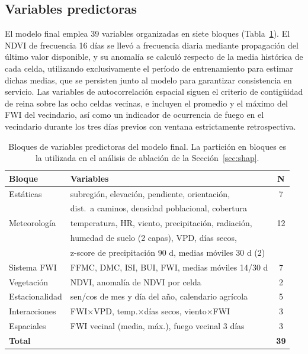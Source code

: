 \documentclass[11pt,a4paper]{article}
\begin{document}
\subsection{Variables predictoras}

El modelo final emplea 39 variables organizadas en siete bloques
(Tabla~\ref{tab:features}). El NDVI de frecuencia 16 días se llevó a
frecuencia diaria mediante propagación del último valor disponible, y su
anomalía se calculó respecto de la media histórica de cada celda,
utilizando exclusivamente el período de entrenamiento para estimar dichas
medias, que se persisten junto al modelo para garantizar consistencia en
servicio. Las variables de autocorrelación espacial siguen el criterio de
contigüidad de reina sobre las ocho celdas vecinas, e incluyen el promedio
y el máximo del FWI del vecindario, así como un indicador de ocurrencia de
fuego en el vecindario durante los tres días previos con ventana
estrictamente retrospectiva.

\begin{table}[H]
\centering\small
\begin{tabular}{@{}llc@{}}
\toprule
\textbf{Bloque} & \textbf{Variables} & \textbf{N} \\
\midrule
Estáticas & subregión, elevación, pendiente, orientación, & 7 \\
 & dist.\ a caminos, densidad poblacional, cobertura & \\
Meteorología & temperatura, HR, viento, precipitación, radiación, & 12 \\
 & humedad de suelo (2 capas), VPD, días secos, & \\
 & z-score de precipitación 90 d, medias móviles 30 d (2) & \\
Sistema FWI & FFMC, DMC, ISI, BUI, FWI, medias móviles 14/30 d & 7 \\
Vegetación & NDVI, anomalía de NDVI por celda & 2 \\
Estacionalidad & sen/cos de mes y día del año, calendario agrícola & 5 \\
Interacciones & FWI$\times$VPD, temp.$\times$días secos, viento$\times$FWI & 3 \\
Espaciales & FWI vecinal (media, máx.), fuego vecinal 3 días & 3 \\
\midrule
\textbf{Total} & & \textbf{39} \\
\bottomrule
\end{tabular}
\caption{Bloques de variables predictoras del modelo final. La partición en
bloques es la utilizada en el análisis de ablación de la
Sección~\ref{sec:shap}.}
\label{tab:features}
\end{table}
\end{document}
